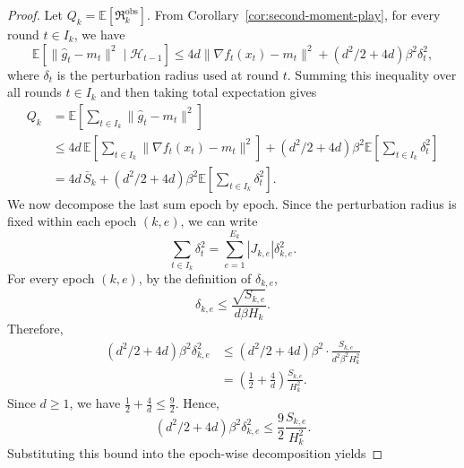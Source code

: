 \documentclass[journal,onecolumn]{IEEEtran}
\theoremstyle{plain}
\theoremstyle{definition}
\theoremstyle{remark}
\newcommand{\regret}{\mathfrak{R}}
\begin{document}
{\begin{proof}
Let $Q_k=\mathbb E[\regret_k^{\mathrm{obs}}]$. From Corollary~\ref{cor:second-moment-play}, for every round $t\in I_k$, we have
\begin{equation*}
\mathbb E\!\left[
    \|\hat g_t-m_t\|^2
    \mid \mathcal H_{t-1}
\right]
\le
4d\|\nabla f_t(x_t)-m_t\|^2
+
(d^2/2+4d)\beta^2\delta_t^2,
\end{equation*}
where $\delta_t$ is the perturbation radius used at round $t$. Summing this
inequality over all rounds $t\in I_k$ and then taking total expectation gives
\begin{equation*}
\begin{aligned}
    Q_k
    &=
    \mathbb E\left[
        \sum_{t\in I_k}\|\hat g_t-m_t\|^2
    \right]  \\
    &\le
    4d\,
    \mathbb E\left[
        \sum_{t\in I_k}\|\nabla f_t(x_t)-m_t\|^2
    \right]
    +
    (d^2/2+4d)\beta^2
    \mathbb E\left[
        \sum_{t\in I_k}\delta_t^2
    \right]  \\
    &=
    4d\,\bar S_k
    +
    (d^2/2+4d)\beta^2
    \mathbb E\left[
        \sum_{t\in I_k}\delta_t^2
    \right].
\end{aligned}
\end{equation*}
We now decompose the last sum epoch by epoch. Since the perturbation radius is
fixed within each epoch $(k,e)$, we can write
\begin{equation*}
    \sum_{t\in I_k}\delta_t^2
    =
    \sum_{e=1}^{E_k}|J_{k,e}|\delta_{k,e}^2.
\end{equation*}
For every epoch $(k,e)$, by the definition of $\delta_{k,e}$,
\begin{equation*}
    \delta_{k,e}
    \le
    \frac{\sqrt{S_{k,e}}}{d\beta H_k}.
\end{equation*}
Therefore,
\begin{equation*}
\begin{aligned}
    (d^2/2+4d)\beta^2\delta_{k,e}^2
    &\le
    (d^2/2+4d)\beta^2
    \cdot
    \frac{S_{k,e}}{d^2\beta^2H_k^2}  \\
    &=
    \left(\frac12+\frac4d\right)
    \frac{S_{k,e}}{H_k^2}.
\end{aligned}
\end{equation*}
Since $d\ge1$, we have $\frac12+\frac4d\le \frac92$. Hence,
\begin{equation*}
    (d^2/2+4d)\beta^2\delta_{k,e}^2
    \le
    \frac92\frac{S_{k,e}}{H_k^2}.
\end{equation*}
Substituting this bound into the epoch-wise decomposition yields

\end{proof}}
\end{document}
